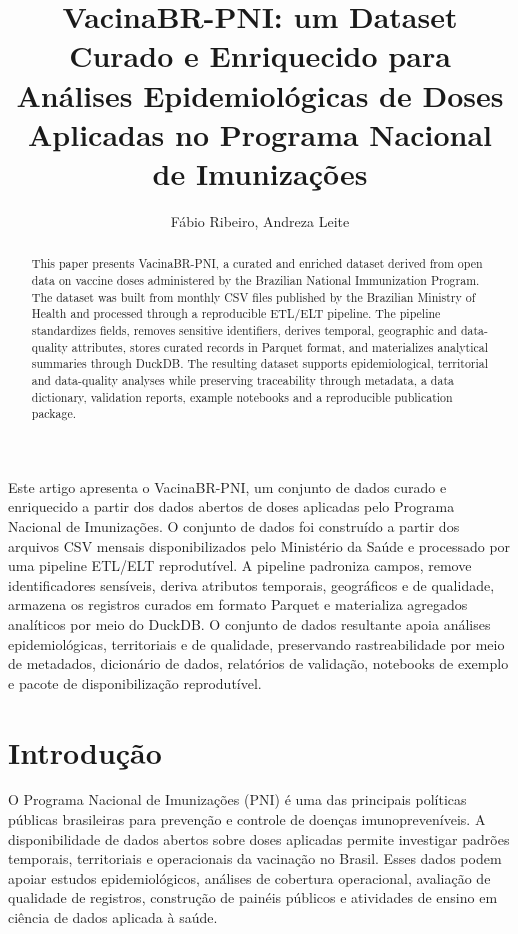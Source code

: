 \documentclass[12pt]{article}
\title{VacinaBR-PNI: um Dataset Curado e Enriquecido para Análises Epidemiológicas de Doses Aplicadas no Programa Nacional de Imunizações}
\author{Fábio Ribeiro\inst{1}, Andreza Leite\inst{1}}
\begin{document}
\maketitle

\begin{abstract}
This paper presents VacinaBR-PNI, a curated and enriched dataset derived from open data on vaccine doses administered by the Brazilian National Immunization Program. The dataset was built from monthly CSV files published by the Brazilian Ministry of Health and processed through a reproducible ETL/ELT pipeline. The pipeline standardizes fields, removes sensitive identifiers, derives temporal, geographic and data-quality attributes, stores curated records in Parquet format, and materializes analytical summaries through DuckDB. The resulting dataset supports epidemiological, territorial and data-quality analyses while preserving traceability through metadata, a data dictionary, validation reports, example notebooks and a reproducible publication package.
\end{abstract}

\begin{resumo}
Este artigo apresenta o VacinaBR-PNI, um conjunto de dados curado e enriquecido a partir dos dados abertos de doses aplicadas pelo Programa Nacional de Imunizações. O conjunto de dados foi construído a partir dos arquivos CSV mensais disponibilizados pelo Ministério da Saúde e processado por uma pipeline ETL/ELT reprodutível. A pipeline padroniza campos, remove identificadores sensíveis, deriva atributos temporais, geográficos e de qualidade, armazena os registros curados em formato Parquet e materializa agregados analíticos por meio do DuckDB. O conjunto de dados resultante apoia análises epidemiológicas, territoriais e de qualidade, preservando rastreabilidade por meio de metadados, dicionário de dados, relatórios de validação, notebooks de exemplo e pacote de disponibilização reprodutível.
\end{resumo}

\section{Introdução}

O Programa Nacional de Imunizações (PNI) é uma das principais políticas públicas brasileiras para prevenção e controle de doenças imunopreveníveis. A disponibilidade de dados abertos sobre doses aplicadas permite investigar padrões temporais, territoriais e operacionais da vacinação no Brasil. Esses dados podem apoiar estudos epidemiológicos, análises de cobertura operacional, avaliação de qualidade de registros, construção de painéis públicos e atividades de ensino em ciência de dados aplicada à saúde.
\end{document}
